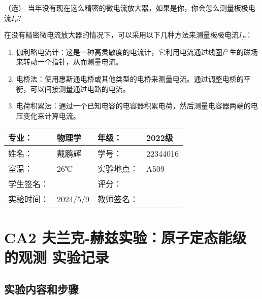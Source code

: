 \documentclass[dvipsnames, svgnames,a4paper,11pt]{article}
\begin{document}
\begin{question}
	（选） 当年没有现在这么精密的微电流放大器，如果是你，你会怎么测量板极电流$I_P$?
\end{question}

	在没有精密微电流放大器的情况下，可以采用以下几种方法来测量板极电流$I_P$：

	\begin{enumerate}
		\item 伽利略电流计：这是一种高灵敏度的电流计，它利用电流通过线圈产生的磁场来转动一个指针，从而测量电流。
		\item 电桥法：使用惠斯通电桥或其他类型的电桥来测量电流。通过调整电桥的平衡，可以间接测量通过电路的电流。
		\item 电荷积累法：通过一个已知电容的电容器积累电荷，然后测量电容器两端的电压变化来计算电流。
	\end{enumerate}



\clearpage
\begin{table}
	\renewcommand\arraystretch{1.7}
	\centering
	\begin{tabularx}{\textwidth}{|X|X|X|X|}
	\hline
	专业：& 物理学 &年级：& 2022级 \\
	\hline
	姓名：& 戴鹏辉 & 学号：& 22344016 \\
	\hline
	室温：& 26℃ & 实验地点： & A509 \\
	\hline
	学生签名：& & 评分： &\\
	\hline
	实验时间：& 2024/5/9 & 教师签名：&\\
	\hline
	\end{tabularx}
\end{table}

\section{CA2 \quad 夫兰克-赫兹实验：原子定态能级的观测 \quad\heiti 实验记录}
\subsection{实验内容和步骤}
\end{document}
